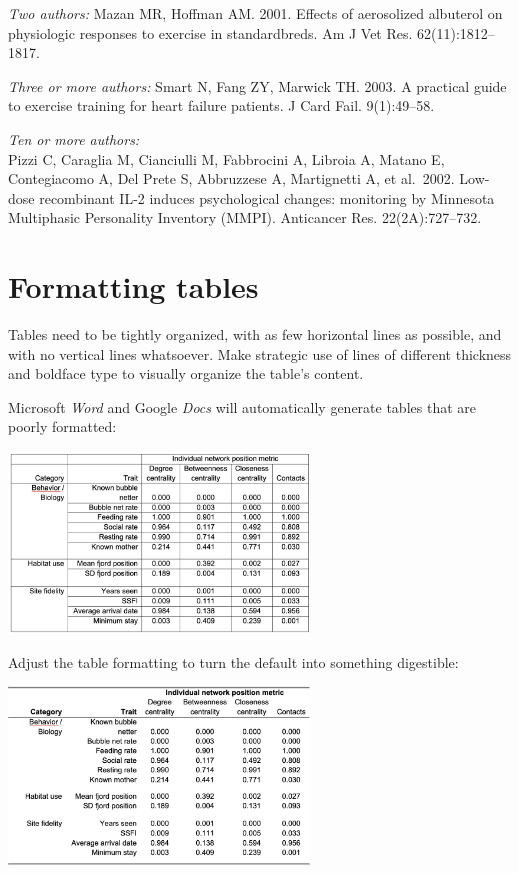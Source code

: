 \documentclass[]{book}
\begin{document}
\emph{Two authors:}
Mazan MR, Hoffman AM. 2001. Effects of aerosolized albuterol on physiologic responses to exercise in standardbreds. Am J Vet Res. 62(11):1812--1817.

\emph{Three or more authors:}
Smart N, Fang ZY, Marwick TH. 2003. A practical guide to exercise training for heart failure patients. J Card Fail. 9(1):49--58.

\emph{Ten or more authors:}\\
Pizzi C, Caraglia M, Cianciulli M, Fabbrocini A, Libroia A, Matano E, Contegiacomo A, Del Prete S, Abbruzzese A, Martignetti A, et al.~2002. Low-dose recombinant IL-2 induces psychological changes: monitoring by Minnesota Multiphasic Personality Inventory (MMPI). Anticancer Res. 22(2A):727--732.

\hypertarget{formatting-tables}{%
\section*{Formatting tables}\label{formatting-tables}}

Tables need to be tightly organized, with as few horizontal lines as possible, and with no vertical lines whatsoever. Make strategic use of lines of different thickness and boldface type to visually organize the table's content.

Microsoft \emph{Word} and Google \emph{Docs} will automatically generate tables that are poorly formatted:

\includegraphics[width=0.6\textwidth,height=\textheight]{img/tables-lined.png}

Adjust the table formatting to turn the default into something digestible:

\includegraphics[width=0.6\textwidth,height=\textheight]{img/tables-good.png}
\end{document}
